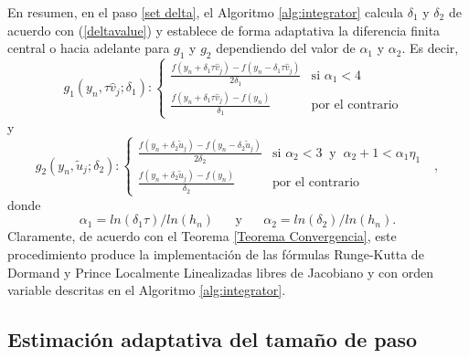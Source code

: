 En resumen, en el paso \ref{set delta}, el Algoritmo \ref{alg:integrator} calcula $\delta_1$ y $\delta_2$ de acuerdo con (\ref{deltavalue}) y establece de forma adaptativa la diferencia finita central o hacia adelante para $g_1$ y $g_2$ dependiendo del valor de $\alpha_1$ y $\alpha_2$. Es decir,
\begin{equation} \label{g1}
	g_{1}(y_{n},\tau \widehat{v}_{j};\delta _{1}) : \left\{
	\begin{array}{cc}
	\frac{f(y_{n}+\delta _{1}\tau\widehat{v}_{j})-f(y_{n}-\delta _{1}\tau\widehat{v}_{j})%
	}{2\delta _{1}} & \text{si }\alpha _{1}<4 \\
	\frac{f(y_{n}+\delta _{1}\tau\widehat{v}_{j})-f(y_{n})}{\delta _{1}} & \text{por el contrario}%
	\end{array}
	\text{ }\right.
\end{equation}
y
\begin{equation}  \label{g2}
	g_{2}(y_{n},\widetilde{u}_{j};\delta _{2}) : \left\{
	\begin{array}{cc}
	\frac{f(y_{n}+\delta _{2}\widetilde{u}_{j})-f(y_{n}-\delta _{2}\widetilde{u}%
		_{j})}{2\delta _{2}} & \text{si }\alpha _{2}<3 \;\;\text{y}\;\; \alpha_2+1 < \alpha_1\eta_1 \\
	\frac{f(y_{n}+\delta _{2}\widetilde{u}_{j})-f(y_{n})}{\delta _{2}} &
    \text{por el contrario}%
	\end{array}%
	\text{ }\right. ,
\end{equation}
donde
\begin{equation} \label{alpha_formulas}
    \alpha_1=ln(\delta_1\tau)/ln(h_n) \;\;\;\;\;\; \text{y} \;\;\;\;\;\; \alpha_2=ln(\delta_2)/ln(h_n).
\end{equation}
Claramente, de acuerdo con el Teorema \ref{Teorema Convergencia}, este procedimiento produce la implementación de las fórmulas Runge-Kutta de Dormand y Prince Localmente Linealizadas libres de Jacobiano y con orden variable descritas en el Algoritmo \ref{alg:integrator}.

\subsection{Estimación adaptativa del tamaño de paso}\label{Sec:AdaptiveLLscheme}

